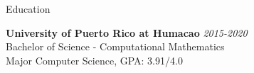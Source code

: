 \documentclass{resume} %
\begin{document}

\begin{rSection}{Education}

{\bf University of Puerto Rico at Humacao} \hfill {\em 2015-2020} \\ 
Bachelor of Science - Computational Mathematics \\
Major Computer Science, GPA: 3.91/4.0 \smallskip \\
\end{rSection}

\end{document}
